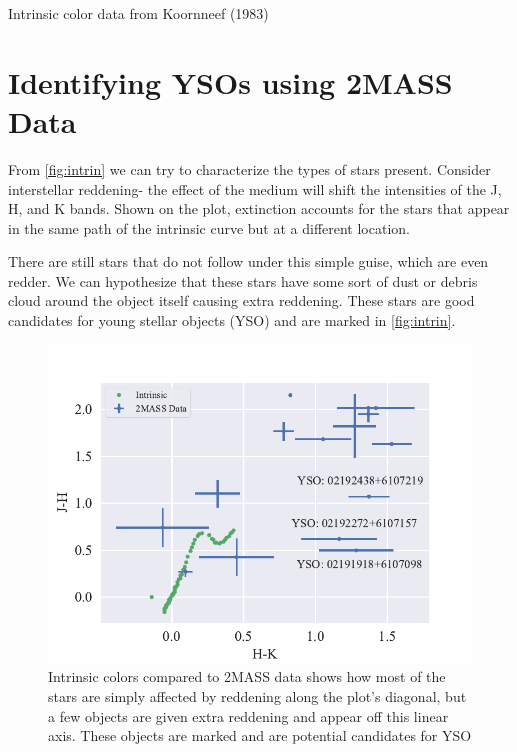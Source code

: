 \documentclass[]{article}
\begin{document}
\begin{table}[H]
	\centering
	\caption{Intrinsic color data from Koornneef (1983)}
	\label{tab:intrin}
\end{table}

\section{Identifying YSOs using 2MASS Data}

From \autoref{fig:intrin} we can try to characterize the types of stars present. Consider interstellar reddening- the effect of the medium will shift the intensities of the J, H, and K bands. Shown on the plot, extinction accounts for the stars that appear in the same path of the intrinsic curve but at a different location.

There are still stars that do not follow under this simple guise, which are even redder. We can hypothesize that these stars have some sort of dust or debris cloud around the object itself causing extra reddening. These stars are good candidates for young stellar objects (YSO) and are marked in \autoref{fig:intrin}.

\begin{figure}[H]
	\centering
	\includegraphics[]{figs/intrinsic.pdf}
	\caption{Intrinsic colors compared to 2MASS data shows how most of the stars are simply affected by reddening along the plot's diagonal, but a few objects are given extra reddening and appear off this linear axis. These objects are marked and are potential candidates for YSO}
	\label{fig:intrin}
\end{figure}
\end{document}
